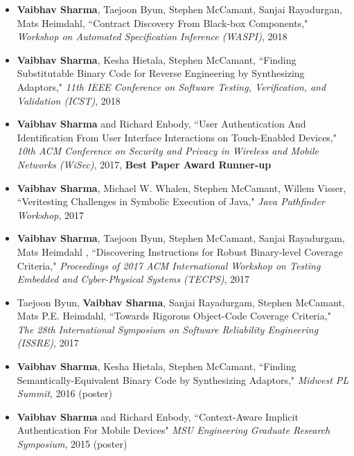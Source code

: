 \documentclass[letterpaper,10pt]{article}
\begin{document}
\begin{itemize}
\item
{\bf Vaibhav Sharma}, Taejoon Byun, Stephen McCamant, Sanjai Rayadurgan, Mats Heimdahl, ``Contract Discovery From Black-box Components," \textit{Workshop on Automated Specification Inference (WASPI)}, 2018
\item
{\bf Vaibhav Sharma}, Kesha Hietala, Stephen McCamant, ``Finding Substitutable Binary Code for Reverse Engineering by Synthesizing Adaptors," \textit{11th IEEE Conference on Software Testing, Verification, and Validation (ICST)}, 2018
\item
{\bf Vaibhav Sharma} and Richard Enbody, ``User Authentication And Identification From User Interface Interactions on Touch-Enabled Devices," \textit{10th ACM Conference on Security and Privacy in Wireless and Mobile Networks (WiSec)}, 2017, {\bf Best Paper Award Runner-up}
\item
{\bf Vaibhav Sharma}, Michael W. Whalen, Stephen McCamant, Willem Visser, ``Veritesting Challenges in Symbolic Execution of Java," \textit{Java Pathfinder Workshop}, 2017
\item
{\bf Vaibhav Sharma}, Taejoon Byun, Stephen McCamant, Sanjai Rayadurgam, Mats Heimdahl , ``Discovering Instructions for Robust Binary-level Coverage Criteria," \textit{Proceedings of 2017 ACM International Workshop on Testing Embedded and Cyber-Physical Systems (TECPS)}, 2017
\item
Taejoon Byun, {\bf Vaibhav Sharma}, Sanjai Rayadurgam, Stephen McCamant, Mats P.E. Heimdahl, ``Towards Rigorous Object-Code Coverage Criteria," \textit{The 28th International Symposium on Software Reliability Engineering (ISSRE)}, 2017
\item
{\bf Vaibhav Sharma}, Kesha Hietala, Stephen McCamant, ``Finding Semantically-Equivalent Binary Code by Synthesizing Adaptors," \textit{Midwest PL Summit}, 2016 (poster) 
\item 
{\bf Vaibhav Sharma} and Richard Enbody, ``Context-Aware Implicit Authentication For Mobile Devices" \textit{MSU Engineering Graduate Research Symposium}, 2015 (poster) 
\end{itemize}
\end{document}
